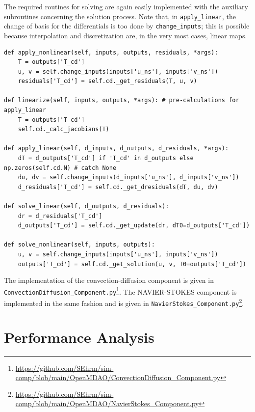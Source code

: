 \documentclass[10pt, ngerman, english,
twoside, open=right,
numbers=noenddot,
declaration=section,
abstract=section,
abstract=multiple,
abstract=notoc,
declaration=notoc,
cd=pale, 
chapterprefix=off, 
chapterpage=false, 
headingsvskip=-10em,
cdgeometry=custom, 
slantedgreek=on,
cdmath=on, 
cdfont=on,
ttfont=false,
mathswap=off,
]{tudscrreprt}
\numberwithin{equation}{chapter}
\renewcommand{\textsc}[1]{\uppercase{\mbox{#1}}}
\begin{document}
The required routines for solving are again easily implemented with the auxiliary subroutines concerning the solution process. Note that, in \texttt{apply\_linear}, the change of basis for the differentials is too done by \texttt{change\_inputs}; this is possible because interpolation and discretization are, in the very most cases, linear maps.
\begin{lstlisting}[firstnumber=22]
def apply_nonlinear(self, inputs, outputs, residuals, *args):
	T = outputs['T_cd']
	u, v = self.change_inputs(inputs['u_ns'], inputs['v_ns'])
    residuals['T_cd'] = self.cd._get_residuals(T, u, v)

def linearize(self, inputs, outputs, *args): # pre-calculations for apply_linear
	T = outputs['T_cd']
    self.cd._calc_jacobians(T)

def apply_linear(self, d_inputs, d_outputs, d_residuals, *args):
    dT = d_outputs['T_cd'] if 'T_cd' in d_outputs else np.zeros(self.cd.N) # catch None
    du, dv = self.change_inputs(d_inputs['u_ns'], d_inputs['v_ns'])
    d_residuals['T_cd'] = self.cd._get_dresiduals(dT, du, dv)

def solve_linear(self, d_outputs, d_residuals):
	dr = d_residuals['T_cd']
    d_outputs['T_cd'] = self.cd._get_update(dr, dT0=d_outputs['T_cd'])

def solve_nonlinear(self, inputs, outputs):
	u, v = self.change_inputs(inputs['u_ns'], inputs['v_ns'])
    outputs['T_cd'] = self.cd._get_solution(u, v, T0=outputs['T_cd'])
\end{lstlisting}
The implementation of the convection-diffusion component is given in \texttt{ConvectionDiffusion\_Component.py}\footnote{\url{https://github.com/SEhrm/sim-comp/blob/main/OpenMDAO/ConvectionDiffusion_Component.py}}. The \textsc{Navier}-\textsc{Stokes} component is implemented in the same fashion and is given in \texttt{NavierStokes\_Component.py}\footnote{\url{https://github.com/SEhrm/sim-comp/blob/main/OpenMDAO/NavierStokes_Component.py}}.
\chapter{Performance Analysis}\label{sec:Perf}
\end{document}
